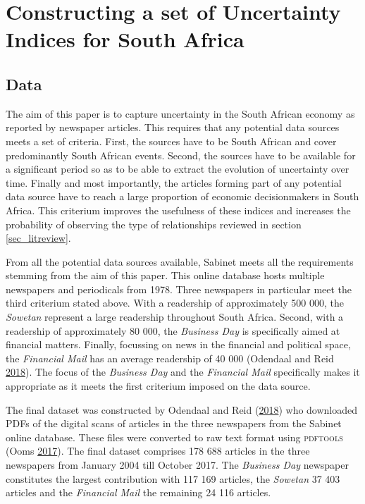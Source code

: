 \documentclass[11pt,preprint, authoryear]{elsarticle}
\numberwithin{equation}{section}
\numberwithin{figure}{section}
\numberwithin{table}{section}
\begin{document}
\section{\texorpdfstring{Constructing a set of Uncertainty Indices for
South Africa
\label{sec_EPU}}{Constructing a set of Uncertainty Indices for South Africa }}\label{constructing-a-set-of-uncertainty-indices-for-south-africa}

\subsection{\texorpdfstring{Data \label{sec_data}}{Data }}\label{data}

The aim of this paper is to capture uncertainty in the South African
economy as reported by newspaper articles. This requires that any potential data sources meets
a set of criteria. First, the sources have to be South African and cover
predominantly South African events. Second, the sources have to be
available for a significant period so as to be able to extract the
evolution of uncertainty over time. Finally and most importantly, the
articles forming part of any potential data source have to reach a large
proportion of economic decisionmakers in South Africa. This criterium improves the usefulness of these indices and increases the probability of observing the type of relationships reviewed in section
\ref{sec_litreview}.

From all the potential data sources available, Sabinet meets all the
requirements stemming from the aim of this paper. This online database
hosts multiple newspapers and periodicals from 1978. Three newspapers in
particular meet the third criterium stated above. With a readership of
approximately 500 000, the \emph{Sowetan} represent a large readership
throughout South Africa. Second, with a readership of approximately 80
000, the \emph{Business Day} is specifically aimed at financial matters.
Finally, focussing on news in the financial and political space, the
\emph{Financial Mail} has an average readership of 40 000 (Odendaal and
Reid \protect\hyperlink{ref-Odendaal2018}{2018}). The focus of the
\emph{Business Day} and the \emph{Financial Mail} specifically makes it
appropriate as it meets the first criterium imposed on the data source.

The final dataset was constructed by Odendaal and Reid
(\protect\hyperlink{ref-Odendaal2018}{2018}) who downloaded PDFs of the
digital scans of articles in the three newspapers from the Sabinet
online database. These files were converted to raw text format using
\textsc{pdftools} (Ooms \protect\hyperlink{ref-Ooms2017}{2017}). The
final dataset comprises 178 688 articles in the three newspapers from
January 2004 till October 2017. The \emph{Business Day} newspaper
constitutes the largest contribution with 117 169 articles, the
\emph{Sowetan} 37 403 articles and the \emph{Financial Mail} the
remaining 24 116 articles.
\end{document}
